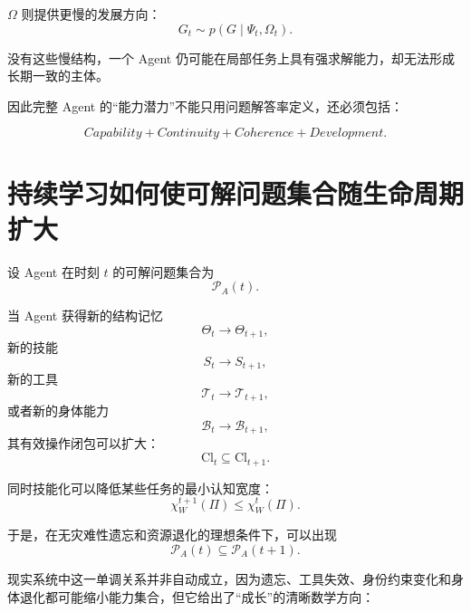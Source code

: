 $\Omega$ 则提供更慢的发展方向：
\begin{equation}
G_t
\sim
p(
G\mid
\Psi_t,\Omega_t
).
\end{equation}

没有这些慢结构，一个 Agent 仍可能在局部任务上具有强求解能力，却无法形成长期一致的主体。

因此完整 Agent 的“能力潜力”不能只用问题解答率定义，还必须包括：

\begin{equation}
\boxed{
Capability
+
Continuity
+
Coherence
+
Development.
}
\end{equation}

\section{持续学习如何使可解问题集合随生命周期扩大}

设 Agent 在时刻 $t$ 的可解问题集合为
\begin{equation}
\mathscr P_A(t).
\end{equation}

当 Agent 获得新的结构记忆
\begin{equation}
\Theta_t\rightarrow\Theta_{t+1},
\end{equation}
新的技能
\begin{equation}
S_t\rightarrow S_{t+1},
\end{equation}
新的工具
\begin{equation}
\mathcal T_t\rightarrow\mathcal T_{t+1},
\end{equation}
或者新的身体能力
\begin{equation}
\mathcal B_t\rightarrow\mathcal B_{t+1},
\end{equation}
其有效操作闭包可以扩大：
\begin{equation}
\mathrm{Cl}_{t}
\subseteq
\mathrm{Cl}_{t+1}.
\end{equation}

同时技能化可以降低某些任务的最小认知宽度：
\begin{equation}
\chi_W^{t+1}(\Pi)
\leq
\chi_W^t(\Pi).
\end{equation}

于是，在无灾难性遗忘和资源退化的理想条件下，可以出现
\begin{equation}
\boxed{
\mathscr P_A(t)
\subseteq
\mathscr P_A(t+1).
}
\end{equation}

现实系统中这一单调关系并非自动成立，因为遗忘、工具失效、身份约束变化和身体退化都可能缩小能力集合，但它给出了“成长”的清晰数学方向：

